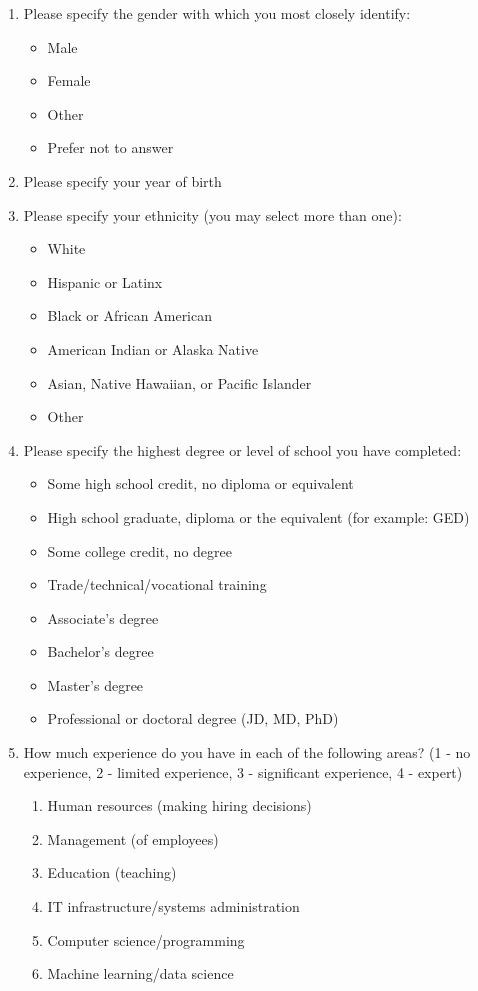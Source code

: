 \documentclass{article}
\begin{document}
\begin{enumerate}
    \item Please specify the gender with which you most closely identify:
    \begin{itemize}
        \item Male
        \item Female
        \item Other
        \item Prefer not to answer
    \end{itemize}
    \item Please specify your year of birth
    \item Please specify your ethnicity (you may select more than one):
    \begin{itemize}
        \item White
        \item Hispanic or Latinx	
        \item Black or African American
        \item American Indian or Alaska Native
        \item Asian, Native Hawaiian, or Pacific Islander
        \item Other
    \end{itemize}
    \item Please specify the highest degree or level of school you have completed:
    \begin{itemize}
        \item Some high school credit, no diploma or equivalent
        \item High school graduate, diploma or the equivalent (for example: GED)
        \item Some college credit, no degree
        \item Trade/technical/vocational training
        \item Associate’s degree
        \item Bachelor’s degree
        \item Master’s degree
        \item Professional or doctoral degree (JD, MD, PhD)
    \end{itemize}
    \item How much experience do you have in each of the following areas? (1 - no experience, 2 - limited experience, 3 - significant experience, 4 - expert)
    \begin{enumerate}
        \item Human resources (making hiring decisions)
        \item Management (of employees)
        \item Education (teaching)
        \item IT infrastructure/systems administration
        \item Computer science/programming
        \item Machine learning/data science
    \end{enumerate}
\end{enumerate}
\end{document}
